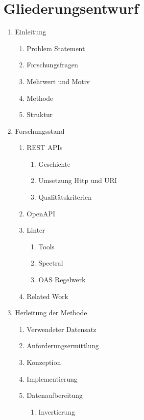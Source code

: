 \section{Gliederungsentwurf}
\begin{enumerate}[label*=\arabic*.]
    \item Einleitung
    \begin{enumerate}[label*=\arabic*.]
        \item Problem Statement
        \item Forschungsfragen
        \item Mehrwert und Motiv
        \item Methode
        \item Struktur
    \end{enumerate}
    \item Forschungsstand
    \begin{enumerate}[label*=\arabic*.]
        \item REST APIs
        \begin{enumerate}[label*=\arabic*.]
            \item Geschichte
            \item Umsetzung Http und URI
            \item Qualitätskriterien
        \end{enumerate}
        \item OpenAPI
        \item Linter
        \begin{enumerate}[label*=\arabic*.]
            \item Tools
            \item Spectral
            \item OAS Regelwerk
        \end{enumerate}
        \item Related Work
    \end{enumerate}
    \item Herleitung der Methode
    \begin{enumerate}[label*=\arabic*.]
        \item Verwendeter Datensatz
        \item Anforderungsermittlung
        \item Konzeption
        \item Implementierung
        \item Datenaufbereitung
                \begin{enumerate}[label*=\arabic*.]
            \item Invertierung

\end{enumerate}
\end{enumerate}
\end{enumerate}
